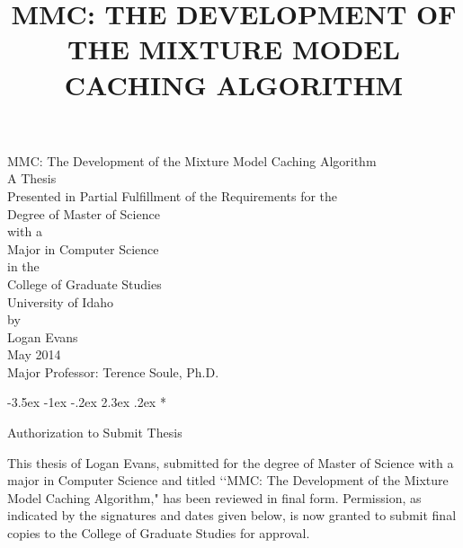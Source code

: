 \documentclass[12pt,letterpaper]{report}
\title{\textbf{MMC: THE DEVELOPMENT OF THE MIXTURE MODEL CACHING ALGORITHM}}
\makeatletter
\renewcommand\section{\@startsection{section}{1}{\z@}%
                                  {-3.5ex \@plus -1ex \@minus -.2ex}%
                                  {2.3ex \@plus.2ex}%
                                  {\normalfont\large\bfseries}}
\makeatother
\begin{document}
 
\pagestyle{myheadings}

\thispagestyle{empty}

\begin{center}
MMC: The Development of the Mixture Model Caching Algorithm\\
\vspace{73pt}
A Thesis\\
Presented in Partial Fulfillment of the Requirements for the\\
Degree of Master of Science\\
with a\\
Major in Computer Science\\
in the\\
College of Graduate Studies\\
University of Idaho\\
\vspace{84pt}
by\\
Logan Evans\\
\vspace{48pt}
May 2014\\
\vspace{60pt}
Major Professor: Terence Soule, Ph.D.\\
\end{center}
\pagebreak

\section*{\vspace*{-35pt}\large{
  \begin{center}
  Authorization to Submit Thesis
  \end{center}}\vspace*{-10pt}}

  \begin{flushleft}
  This thesis of Logan Evans, submitted for the degree of Master of Science with
  a major in Computer Science and titled \lq\lq MMC: The Development of the
  Mixture Model Caching Algorithm," has been reviewed in final form. Permission,
  as indicated by the signatures and dates given below, is now granted to submit
  final copies to the College of Graduate Studies for approval.
  \end{flushleft}
\end{document}
